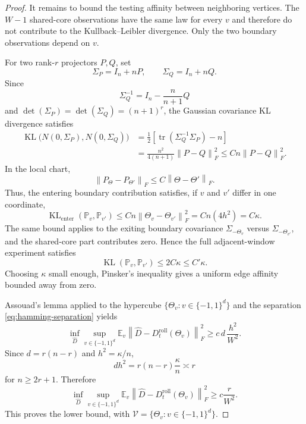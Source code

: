 \documentclass[11pt]{article}
\theoremstyle{tightplain}
\theoremstyle{tightdef}
\DeclareMathOperator{\tr}{tr}
\DeclareMathOperator{\KL}{KL}
\newcommand{\E}{\mathbb E}
\newcommand{\norm}[1]{\left\lVert #1 \right\rVert}
\begin{document}
\begin{proof}
It remains to bound the testing affinity between neighboring vertices. The
$W-1$ shared-core observations have the same law for every $v$ and therefore do
not contribute to the Kullback--Leibler divergence. Only the two boundary
observations depend on $v$.

For two rank-$r$ projectors $P,Q$, set
\[
\Sigma_P=I_n+nP,
\qquad
\Sigma_Q=I_n+nQ.
\]
Since
\[
\Sigma_Q^{-1}=I_n-\frac n{n+1}Q
\]
and $\det(\Sigma_P)=\det(\Sigma_Q)=(n+1)^r$, the Gaussian covariance KL
divergence satisfies
\[
\begin{aligned}
\KL\bigl(N(0,\Sigma_P),N(0,\Sigma_Q)\bigr)
&=
\frac12\left[
\tr(\Sigma_Q^{-1}\Sigma_P)-n
\right]  \\
&=
\frac{n^2}{4(n+1)}\norm{P-Q}_F^2
\le
C n \norm{P-Q}_F^2 .
\end{aligned}
\]
In the local chart,
\[
\norm{P_\Theta-P_{\Theta'}}_F
\le
C\norm{\Theta-\Theta'}_F.
\]
Thus, the entering boundary contribution satisfies, if $v$ and $v'$ differ in
one coordinate,
\[
\KL_{\mathrm{enter}}(\mathbb P_v,\mathbb P_{v'})
\le
C n \norm{\Theta_v-\Theta_{v'}}_F^2
=C n(4h^2)
=C\kappa .
\]
The same bound applies to the exiting boundary covariance
$\Sigma_{-\Theta_v}$ versus $\Sigma_{-\Theta_{v'}}$, and the shared-core part
contributes zero. Hence the full adjacent-window experiment satisfies
\[
\KL(\mathbb P_v,\mathbb P_{v'})
\le 2C\kappa
\le C'\kappa .
\]
Choosing $\kappa$ small enough, Pinsker's inequality
\cite[Ch.~2]{Tsybakov2009} gives a uniform edge affinity bounded away from
zero.

Assouad's lemma \cite{Assouad1983,Yu1997} applied to the hypercube
$\{\Theta_v:v\in\{-1,1\}^d\}$ and the separation
\eqref{eq:hamming-separation} yields
\[
\inf_{\widehat D}
\sup_{v\in\{-1,1\}^d}
\E_v\norm{\widehat D-D_t^{\mathrm{roll}}(\Theta_v)}_F^2
\ge
c\,d\,\frac{h^2}{W^2}.
\]
Since $d=r(n-r)$ and $h^2=\kappa/n$,
\[
d h^2
=r(n-r)\frac{\kappa}{n}
\asymp r
\]
for $n\ge2r+1$. Therefore
\[
\inf_{\widehat D}\sup_{v\in\{-1,1\}^d}
\E_v\norm{\widehat D-D_t^{\mathrm{roll}}(\Theta_v)}_F^2
\ge
c\frac r{W^2}.
\]
This proves the lower bound, with $\mathcal V=\{\Theta_v:v\in\{-1,1\}^d\}$.
\end{proof}
\end{document}
